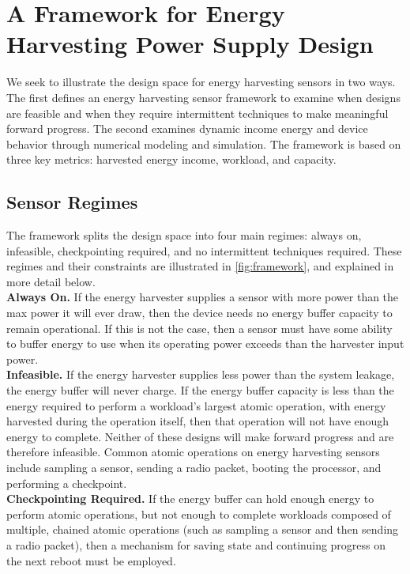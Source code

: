 \section{A Framework for Energy Harvesting Power Supply Design}
\label{sec:framework}
We seek to illustrate the design space for energy harvesting sensors in two
ways. The first defines an energy harvesting sensor framework to examine
when designs are feasible and when they require intermittent techniques to make meaningful forward progress.
The second examines dynamic income energy and device behavior through numerical
modeling and simulation.  The framework is based on three key metrics:
harvested energy income, workload, and capacity.

\subsection{Sensor Regimes}
\label{sec:framework:regime}
The framework splits the design space into four main regimes: always on,
infeasible, checkpointing required, and no intermittent techniques required.
These regimes and their constraints are illustrated in \cref{fig:framework},
and explained in more detail below. \\

\vspace{-6pt}
\noindent
\textbf{Always On.} If the energy harvester supplies a sensor with
more power than the max power it will ever draw, then the device needs
no energy buffer capacity to remain operational. If this is not the case,
then a sensor must have some ability to buffer energy to use when its
operating power exceeds than the harvester input power.
\\

\vspace{-6pt}
\noindent
\textbf{Infeasible.} If the energy harvester supplies less power than
the system leakage, the energy buffer will never
charge. If the energy buffer capacity is less than the
energy required to perform a workload's largest atomic operation, with energy harvested
during the operation itself, then that operation will not have enough energy to
complete.  Neither of these designs will make forward progress and are
therefore infeasible.
Common atomic operations on energy harvesting sensors include sampling a sensor,
sending a radio packet, booting the processor, and performing a checkpoint.
\\

\vspace{-6pt}
\noindent
\textbf{Checkpointing Required.} If the energy buffer can
hold enough energy to perform atomic operations, but
not enough to complete
workloads composed of multiple, chained
atomic operations (such as sampling a sensor and then sending a radio packet), then
a mechanism for saving state and continuing progress on the next reboot
must be employed.
\\

